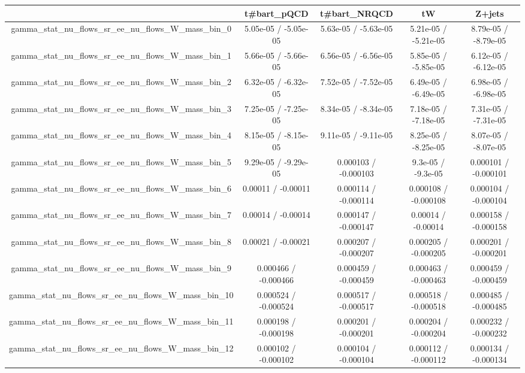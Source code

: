 \documentclass[10pt]{article}
\begin{document}
\begin{table}[htbp]
\begin{center}
\begin{tabular}{|c|c|c|c|c|}
\hline 
      & t#bar{t}_{pQCD}      & t#bar{t}_{NRQCD}      & tW      & Z+jets \\ 
\hline 
  gamma_stat_nu_flows_sr_ee_nu_flows_W_mass_bin_0 & 5.05e-05 / -5.05e-05 & 5.63e-05 / -5.63e-05 & 5.21e-05 / -5.21e-05 & 8.79e-05 / -8.79e-05 \\ 
  gamma_stat_nu_flows_sr_ee_nu_flows_W_mass_bin_1 & 5.66e-05 / -5.66e-05 & 6.56e-05 / -6.56e-05 & 5.85e-05 / -5.85e-05 & 6.12e-05 / -6.12e-05 \\ 
  gamma_stat_nu_flows_sr_ee_nu_flows_W_mass_bin_2 & 6.32e-05 / -6.32e-05 & 7.52e-05 / -7.52e-05 & 6.49e-05 / -6.49e-05 & 6.98e-05 / -6.98e-05 \\ 
  gamma_stat_nu_flows_sr_ee_nu_flows_W_mass_bin_3 & 7.25e-05 / -7.25e-05 & 8.34e-05 / -8.34e-05 & 7.18e-05 / -7.18e-05 & 7.31e-05 / -7.31e-05 \\ 
  gamma_stat_nu_flows_sr_ee_nu_flows_W_mass_bin_4 & 8.15e-05 / -8.15e-05 & 9.11e-05 / -9.11e-05 & 8.25e-05 / -8.25e-05 & 8.07e-05 / -8.07e-05 \\ 
  gamma_stat_nu_flows_sr_ee_nu_flows_W_mass_bin_5 & 9.29e-05 / -9.29e-05 & 0.000103 / -0.000103 & 9.3e-05 / -9.3e-05 & 0.000101 / -0.000101 \\ 
  gamma_stat_nu_flows_sr_ee_nu_flows_W_mass_bin_6 & 0.00011 / -0.00011 & 0.000114 / -0.000114 & 0.000108 / -0.000108 & 0.000104 / -0.000104 \\ 
  gamma_stat_nu_flows_sr_ee_nu_flows_W_mass_bin_7 & 0.00014 / -0.00014 & 0.000147 / -0.000147 & 0.00014 / -0.00014 & 0.000158 / -0.000158 \\ 
  gamma_stat_nu_flows_sr_ee_nu_flows_W_mass_bin_8 & 0.00021 / -0.00021 & 0.000207 / -0.000207 & 0.000205 / -0.000205 & 0.000201 / -0.000201 \\ 
  gamma_stat_nu_flows_sr_ee_nu_flows_W_mass_bin_9 & 0.000466 / -0.000466 & 0.000459 / -0.000459 & 0.000463 / -0.000463 & 0.000459 / -0.000459 \\ 
  gamma_stat_nu_flows_sr_ee_nu_flows_W_mass_bin_10 & 0.000524 / -0.000524 & 0.000517 / -0.000517 & 0.000518 / -0.000518 & 0.000485 / -0.000485 \\ 
  gamma_stat_nu_flows_sr_ee_nu_flows_W_mass_bin_11 & 0.000198 / -0.000198 & 0.000201 / -0.000201 & 0.000204 / -0.000204 & 0.000232 / -0.000232 \\ 
  gamma_stat_nu_flows_sr_ee_nu_flows_W_mass_bin_12 & 0.000102 / -0.000102 & 0.000104 / -0.000104 & 0.000112 / -0.000112 & 0.000134 / -0.000134 \\ 

\end{tabular}
\end{center}
\end{table}
\end{document}
